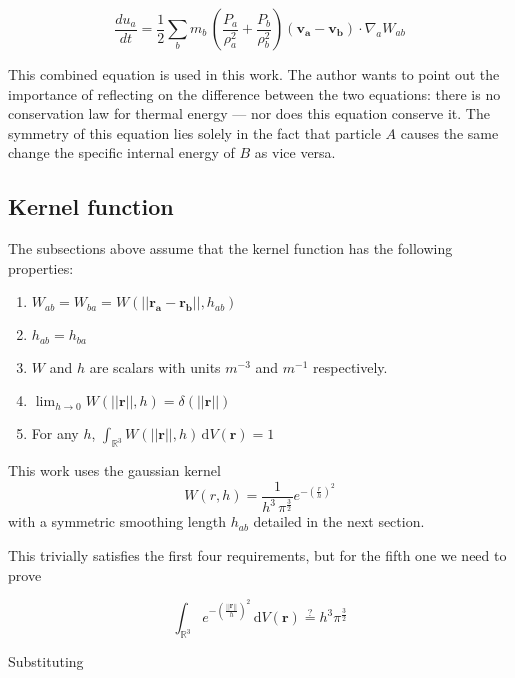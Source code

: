 \documentclass[../main.tex]{subfiles}
\begin{document}
\begin{equation}
    \frac{du_a}{dt}
    = \frac{1}{2} \sum_b m_b \, (\frac{P_a}{\rho_a^2} + \frac{P_b}{\rho_b^2}) (\bm{v_a} - \bm{v_b}) \cdot
    \nabla_a W_{ab}
\end{equation}

This combined equation is used in this work. The author wants to point out the importance of
reflecting on the difference between the two equations: there is no conservation law for thermal
energy --- nor does this equation conserve it. The symmetry of this equation lies solely in the fact
that particle $A$ causes the same change the specific internal energy of $B$ as vice versa.

\subsection{Kernel function}

The subsections above assume that the kernel function has the following properties:

\begin{enumerate}
    \item $W_{ab} = W_{ba} = W(||\bm{r_a} - \bm{r_b}||, h_{ab})$
    \item $h_{ab} = h_{ba}$
    \item $W$ and $h$ are scalars with units $m^{-3}$ and $m^{-1}$ respectively.
    \item ${\displaystyle \lim_{h\to0} W(||\bm{r}||, h) = \delta(||\bm{r}||) }$
    \item For any $h$, ${\displaystyle \int_{\mathbb{R}^3} \! W(||\bm{r}||, h) \, \mathrm{d} V(\bm{r}) = 1}$
\end{enumerate}

This work uses the gaussian kernel
\begin{equation}
    W(r, h) = \frac{1}{h^3 \, \pi^{\frac{3}{2}}} e^{-(\frac{r}{h})^2}
\end{equation}
with a symmetric smoothing length $h_{ab}$ detailed in the next section.

This trivially satisfies the first four requirements, but for the fifth one we
need to prove

\begin{equation}
    {\displaystyle \int_{\mathbb{R}^3} \!
        e^{-(\frac{||\bm{r}||}{h})^2}
        \, \mathrm{d} V(\bm{r})
    \stackrel{?}{=} h^3 \pi^\frac{3}{2}}
\end{equation}

Substituting
\end{document}

